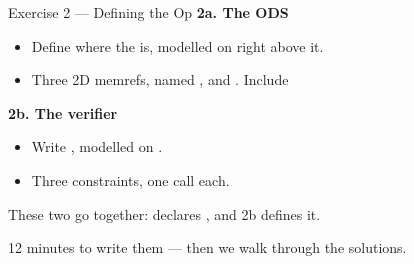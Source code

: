 \documentclass[aspectratio=169,10pt]{beamer}
\begin{document}
\begin{frame}{Exercise 2 --- Defining the Op}
  \textbf{2a. The ODS}\quad {}
  \begin{itemize}
    \item Define  where the  is, modelled on
       right above it.
    \item Three 2D  memrefs, named ,  and .
      Include \mbox{}
  \end{itemize}
  \vspace{0.8em}
  \textbf{2b. The verifier}\quad {}
  \begin{itemize}
    \item Write \mbox{}, modelled on
      \mbox{}.
    \item Three constraints, one  call each.
  \end{itemize}
  \vspace{0.8em}
  \begin{center}\small\color{scgrey}
    These two go together:  declares ,
    and 2b defines it.
  \end{center}
  \vspace{0.4em}
  \begin{center}\color{scaccent}\large
    12 minutes to write them --- then we walk through the solutions.
  \end{center}
\end{frame}
\end{document}

